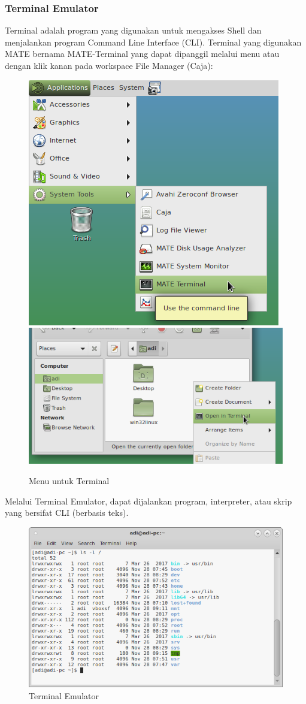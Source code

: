 \documentclass[12pt,]{article}
\begin{document}
	\subsubsection{Terminal Emulator}
	Terminal adalah program yang digunakan untuk mengakses Shell dan menjalankan program Command Line Interface (CLI).
	Terminal yang digunakan MATE bernama MATE-Terminal yang dapat dipanggil melalui menu atau dengan klik kanan pada workspace File Manager (Caja):
	\begin{figure}[H]
		\centering
		\includegraphics[width=0.4\linewidth]{images/mateapp/terminal1}
		\includegraphics[width=0.4\linewidth]{images/mateapp/terminal2}
		\caption{Menu untuk Terminal}
	\end{figure} 
	
	Melalui Terminal Emulator, dapat dijalankan program, interpreter, atau skrip yang bersifat CLI (berbasis teks).
	\begin{figure}[H]
		\centering
		\includegraphics[width=0.8\linewidth]{images/mateapp/terminal3}
		\caption{Terminal Emulator}
	\end{figure}
\end{document}
